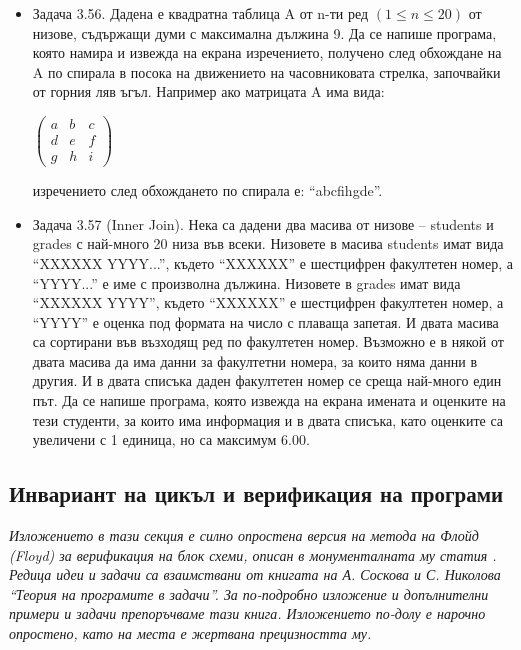{\begin{itemize}[resume]
  \item Задача 3.56. \cite{sbornik} Дадена е квадратна таблица A от n-ти ред $(1 \le n \le 20)$ от низове, съдържащи думи с максимална дължина 9. Да се напише програма, която намира и извежда на екрана изречението, получено след обхождане на A по спирала в посока на движението на часовниковата стрелка, започвайки от горния ляв ъгъл. Например ако матрицата A има вида:

  $\left( \begin{array}{ccc}
  a & b & c \\
  d & e & f \\
  g & h & i
  \end{array} \right)$

  изречението след обхождането по спирала е: ``abcfihgde''.

  \item Задача 3.57 (Inner Join). \cite{sbornik} Нека са дадени два масива от низове – students и grades с най-много 20 низа във всеки. Низовете в масива students имат вида ``XXXXXX YYYY...'', където ``XXXXXX'' е шестцифрен факултетен номер, а ``YYYY...'' е име с произволна дължина. Низовете в grades имат вида ``XXXXXX YYYY'', където ``XXXXXX'' е шестцифрен факултетен номер, а ``YYYY'' е оценка под формата на число с плаваща запетая. И двата масива са сортирани във възходящ ред по факултетен номер. Възможно е в някой от двата масива да има данни за факултетни номера, за които няма данни в другия. И в двата списъка даден факултетен номер се среща най-много един път. Да се напише програма, която извежда на екрана имената и оценките на тези студенти, за които има информация и в двата списъка, като оценките са увеличени с 1 единица, но са максимум 6.00.

\end{itemize}

\subsection{Инвариант на цикъл и верификация на програми}

\emph{Изложението в тази секция е силно опростена версия на метода на Флойд (Floyd) за верификация на блок схеми, описан в монументалната му статия \cite{floyd}. Редица идеи и задачи са взаимствани от книгата \cite{tpsbornik} на А. Соскова и С. Николова ``Теория на програмите в задачи''. За по-подробно изложение и допълнителни примери и задачи препоръчваме тази книга. Изложението по-долу е нарочно опростено, като на места е жертвана прецизността му.}

}
